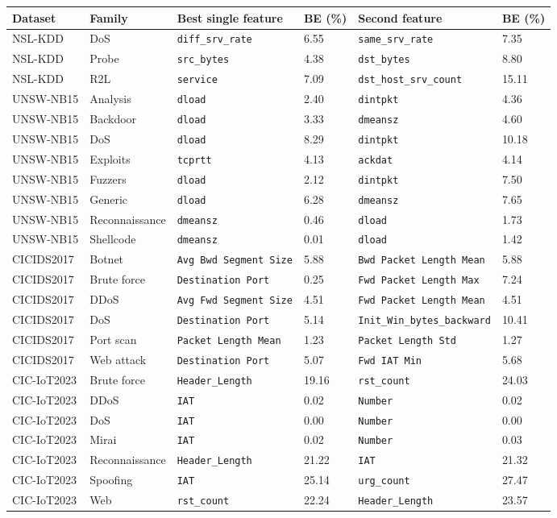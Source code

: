 \begin{tabular}{llllll}
\toprule
Dataset & Family & Best single feature & BE (\%) & Second feature & BE (\%) \\
\midrule
NSL-KDD & DoS & \texttt{diff\_srv\_rate} & 6.55 & \texttt{same\_srv\_rate} & 7.35 \\
NSL-KDD & Probe & \texttt{src\_bytes} & 4.38 & \texttt{dst\_bytes} & 8.80 \\
NSL-KDD & R2L & \texttt{service} & 7.09 & \texttt{dst\_host\_srv\_count} & 15.11 \\
UNSW-NB15 & Analysis & \texttt{dload} & 2.40 & \texttt{dintpkt} & 4.36 \\
UNSW-NB15 & Backdoor & \texttt{dload} & 3.33 & \texttt{dmeansz} & 4.60 \\
UNSW-NB15 & DoS & \texttt{dload} & 8.29 & \texttt{dintpkt} & 10.18 \\
UNSW-NB15 & Exploits & \texttt{tcprtt} & 4.13 & \texttt{ackdat} & 4.14 \\
UNSW-NB15 & Fuzzers & \texttt{dload} & 2.12 & \texttt{dintpkt} & 7.50 \\
UNSW-NB15 & Generic & \texttt{dload} & 6.28 & \texttt{dmeansz} & 7.65 \\
UNSW-NB15 & Reconnaissance & \texttt{dmeansz} & 0.46 & \texttt{dload} & 1.73 \\
UNSW-NB15 & Shellcode & \texttt{dmeansz} & 0.01 & \texttt{dload} & 1.42 \\
CICIDS2017 & Botnet & \texttt{Avg Bwd Segment Size} & 5.88 & \texttt{Bwd Packet Length Mean} & 5.88 \\
CICIDS2017 & Brute force & \texttt{Destination Port} & 0.25 & \texttt{Fwd Packet Length Max} & 7.24 \\
CICIDS2017 & DDoS & \texttt{Avg Fwd Segment Size} & 4.51 & \texttt{Fwd Packet Length Mean} & 4.51 \\
CICIDS2017 & DoS & \texttt{Destination Port} & 5.14 & \texttt{Init\_Win\_bytes\_backward} & 10.41 \\
CICIDS2017 & Port scan & \texttt{Packet Length Mean} & 1.23 & \texttt{Packet Length Std} & 1.27 \\
CICIDS2017 & Web attack & \texttt{Destination Port} & 5.07 & \texttt{Fwd IAT Min} & 5.68 \\
CIC-IoT2023 & Brute force & \texttt{Header\_Length} & 19.16 & \texttt{rst\_count} & 24.03 \\
CIC-IoT2023 & DDoS & \texttt{IAT} & 0.02 & \texttt{Number} & 0.02 \\
CIC-IoT2023 & DoS & \texttt{IAT} & 0.00 & \texttt{Number} & 0.00 \\
CIC-IoT2023 & Mirai & \texttt{IAT} & 0.02 & \texttt{Number} & 0.03 \\
CIC-IoT2023 & Reconnaissance & \texttt{Header\_Length} & 21.22 & \texttt{IAT} & 21.32 \\
CIC-IoT2023 & Spoofing & \texttt{IAT} & 25.14 & \texttt{urg\_count} & 27.47 \\
CIC-IoT2023 & Web & \texttt{rst\_count} & 22.24 & \texttt{Header\_Length} & 23.57 \\
\bottomrule
\end{tabular}
